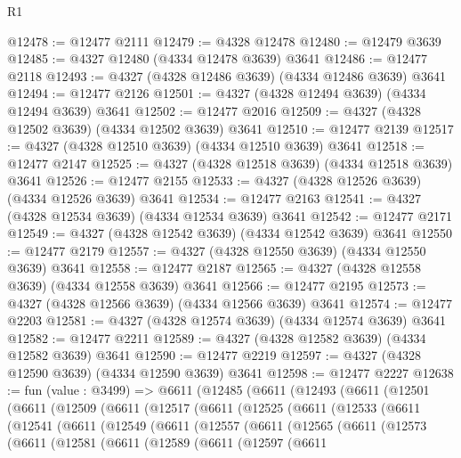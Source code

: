 \begin{lexlean}{R1}
\begin{coremodule}
@12478 := @12477 @2111
@12479 := @4328 @12478
@12480 := @12479 @3639
@12485 := @4327 @12480 (@4334 @12478 @3639) @3641
@12486 := @12477 @2118
@12493 := @4327 (@4328 @12486 @3639) (@4334 @12486 @3639) @3641
@12494 := @12477 @2126
@12501 := @4327 (@4328 @12494 @3639) (@4334 @12494 @3639) @3641
@12502 := @12477 @2016
@12509 := @4327 (@4328 @12502 @3639) (@4334 @12502 @3639) @3641
@12510 := @12477 @2139
@12517 := @4327 (@4328 @12510 @3639) (@4334 @12510 @3639) @3641
@12518 := @12477 @2147
@12525 := @4327 (@4328 @12518 @3639) (@4334 @12518 @3639) @3641
@12526 := @12477 @2155
@12533 := @4327 (@4328 @12526 @3639) (@4334 @12526 @3639) @3641
@12534 := @12477 @2163
@12541 := @4327 (@4328 @12534 @3639) (@4334 @12534 @3639) @3641
@12542 := @12477 @2171
@12549 := @4327 (@4328 @12542 @3639) (@4334 @12542 @3639) @3641
@12550 := @12477 @2179
@12557 := @4327 (@4328 @12550 @3639) (@4334 @12550 @3639) @3641
@12558 := @12477 @2187
@12565 := @4327 (@4328 @12558 @3639) (@4334 @12558 @3639) @3641
@12566 := @12477 @2195
@12573 := @4327 (@4328 @12566 @3639) (@4334 @12566 @3639) @3641
@12574 := @12477 @2203
@12581 := @4327 (@4328 @12574 @3639) (@4334 @12574 @3639) @3641
@12582 := @12477 @2211
@12589 := @4327 (@4328 @12582 @3639) (@4334 @12582 @3639) @3641
@12590 := @12477 @2219
@12597 := @4327 (@4328 @12590 @3639) (@4334 @12590 @3639) @3641
@12598 := @12477 @2227
@12638 := fun (value : @3499) =>
  @6611
    (@12485
      (@6611
        (@12493
          (@6611
            (@12501
              (@6611
                (@12509
                  (@6611
                    (@12517
                      (@6611
                        (@12525
                          (@6611
                            (@12533
                              (@6611
                                (@12541
                                  (@6611
                                    (@12549
                                      (@6611
                                        (@12557
                                          (@6611
                                            (@12565
                                              (@6611
                                                (@12573
                                                  (@6611
                                                    (@12581
                                                      (@6611
                                                        (@12589
                                                          (@6611
                                                            (@12597
                                                              (@6611

\end{coremodule}
\end{lexlean}
